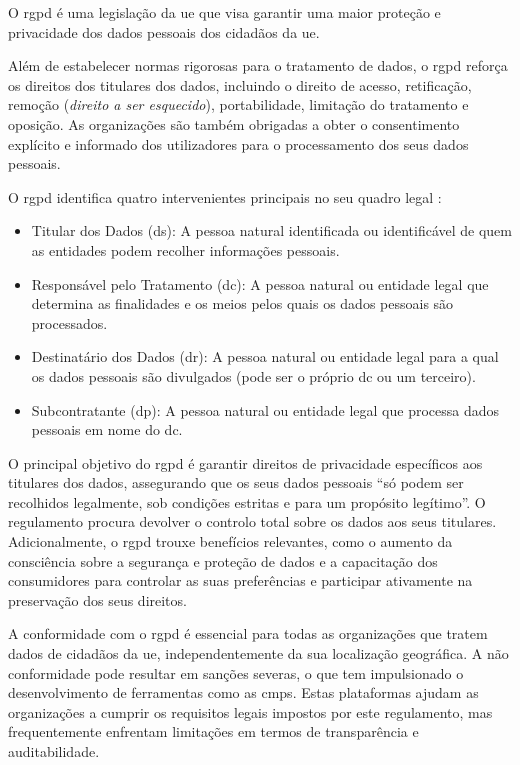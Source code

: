 O \acrshort{rgpd} é uma legislação da \acrfull{ue} que visa garantir uma maior proteção e privacidade dos dados pessoais dos cidadãos da \acrshort{ue}.

Além de estabelecer normas rigorosas para o tratamento de dados, o \acrshort{rgpd} reforça os direitos dos titulares dos dados, incluindo o direito de acesso, retificação, remoção (\textit{direito a ser esquecido}), portabilidade, limitação do tratamento e oposição. As organizações são também obrigadas a obter o consentimento explícito e informado dos utilizadores para o processamento dos seus dados pessoais. \citep{Daudén-Esmel2024}

O \acrshort{rgpd} identifica quatro intervenientes principais no seu quadro legal \citep{gdpr2016}:  
\begin{itemize}
    \item Titular dos Dados (\acrfull{ds}): A pessoa natural identificada ou identificável de quem as entidades podem recolher informações pessoais.  
    \item Responsável pelo Tratamento (\acrfull{dc}): A pessoa natural ou entidade legal que determina as finalidades e os meios pelos quais os dados pessoais são processados.  
    \item Destinatário dos Dados (\acrfull{dr}): A pessoa natural ou entidade legal para a qual os dados pessoais são divulgados (pode ser o próprio \acrshort{dc} ou um terceiro).  
    \item Subcontratante (\acrfull{dp}): A pessoa natural ou entidade legal que processa dados pessoais em nome do \acrshort{dc}.
\end{itemize}

O principal objetivo do \acrshort{rgpd} é garantir direitos de privacidade específicos aos titulares dos dados, assegurando que os seus dados pessoais “só podem ser recolhidos legalmente, sob condições estritas e para um propósito legítimo”. O regulamento procura devolver o controlo total sobre os dados aos seus titulares. Adicionalmente, o \acrshort{rgpd} trouxe benefícios relevantes, como o aumento da consciência sobre a segurança e proteção de dados e a capacitação dos consumidores para controlar as suas preferências e participar ativamente na preservação dos seus direitos.

A conformidade com o \acrshort{rgpd} é essencial para todas as organizações que tratem dados de cidadãos da \acrshort{ue}, independentemente da sua localização geográfica. A não conformidade pode resultar em sanções severas, o que tem impulsionado o desenvolvimento de ferramentas como as \acrshort{cmp}s. Estas plataformas ajudam as organizações a cumprir os requisitos legais impostos por este regulamento, mas frequentemente enfrentam limitações em termos de transparência e auditabilidade.

